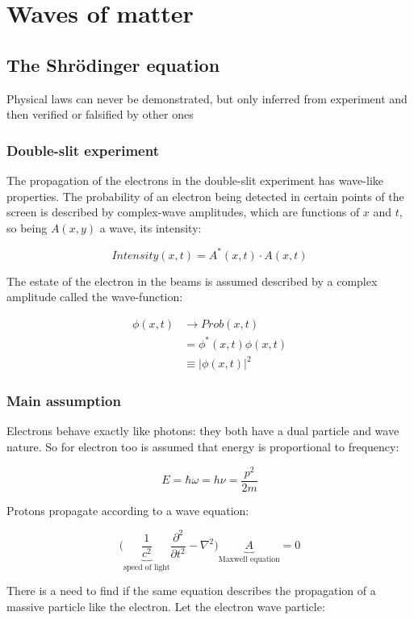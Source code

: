 \chapter{Waves of matter}

\section{The Shr\"odinger equation}
Physical laws can never be demonstrated, but only inferred from experiment and then verified or falsified by other ones


  \subsection{Double-slit experiment}
  The propagation of the electrons in the double-slit experiment has wave-like properties.
  The probability of an electron being detected in certain points of the screen is described by complex-wave amplitudes, which are functions of $x$ and $t$, so being $A(x,y)$ a wave, its intensity:

  $$Intensity(x,t) = A^*(x,t)\cdot A(x,t)$$

  The estate of the electron in the beams is assumed described by a complex amplitude called the wave-function:

  \begin{align*}
    \phi(x,t) &\rightarrow Prob(x,t)\\
              &=\phi^*(x,t)\phi(x,t)\\
              &\equiv |\phi(x,t)|^2
  \end{align*}

  \subsection{Main assumption}
  Electrons behave exactly like photons: they both have a dual particle and wave nature.
  So for electron too is assumed that energy is proportional to frequency:

  $$E = \hbar\omega = h\nu = \frac{p^2}{2m}$$

  Protons propagate according to a wave equation:

  $$\biggl(\underbrace{\frac{1}{c^2}}_{\text{speed of light}}\frac{\partial^2{}}{\partial{t^2}} - \nabla^2\biggr)\underbrace{A}_{\text{Maxwell equation}} = 0$$

  There is a need to find if the same equation describes the propagation of a massive particle like the electron.
  Let the electron wave particle:

